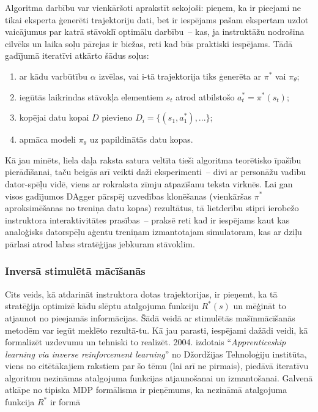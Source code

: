 \documentclass[12pt, a4paper]{article}
\numberwithin{equation}{section} %
\begin{document}
Algoritma darbību var vienkāršoti aprakstīt sekojoši: pieņem, ka ir pieejami ne tikai eksperta ģenerēti trajektoriju dati, bet ir iespējams pašam ekspertam uzdot vaicājumus par katrā stāvoklī optimālu darbību~-- kas, ja instruktāžu nodrošina cilvēks un laika soļu pārejas ir biežas, reti kad būs praktiski iespējams. Tādā gadījumā iteratīvi atkārto šādus soļus:

\begin{enumerate}
    \item ar kādu varbūtību $\alpha$ izvēlas, vai i-tā trajektorija tiks ģenerēta ar $\pi^*$ vai $\pi_{\theta}$;
    \item iegūtās laikrindas stāvokļa elementiem $s_t$ atrod atbilstošo $a^*_t=\pi^*(s_t)$;
    \item kopējai datu kopai $D$ pievieno $D_i=\lbrace (s_1, a^*_1),... \rbrace$;
    \item apmāca modeli $\pi_{\theta}$ uz papildinātās datu kopas.
\end{enumerate}

Kā jau minēts, liela daļa raksta satura veltīta tieši algoritma teorētisko īpašību pierādīšanai, taču beigās arī veikti daži eksperimenti~-- divi ar personāžu vadību dator-spēļu vidē, viens ar rokraksta zīmju atpazīšanu teksta virknēs. Lai gan visos gadījumos DAgger pārspēj uzvedības klonēšanas (vienkāršas $\pi^*$ aproksimēšanas no treniņa datu kopas) rezultātus, tā lietderību stipri ierobežo instruktora interaktivitātes prasības~-- praksē reti kad ir iespējams kaut kas analoģisks datorspēļu aģentu treniņam izmantotajam simulatoram, kas ar dziļu pārlasi atrod labas stratēģijas jebkuram stāvoklim.

\subsubsection{Inversā stimulētā mācīšanās}

Cits veids, kā atdarināt instruktora dotas trajektorijas, ir pieņemt, ka tā stratēģija optimizē kādu slēptu atalgojuma funkciju $R^*(s)$ un mēģināt to atjaunot no pieejamās informācijas. Šādā veidā ar stimulētās mašīnmācīšanās metodēm var iegūt meklēto rezultā-tu. Kā jau parasti, iespējami dažādi veidi, kā formalizēt uzdevumu un tehniski to realizēt. 2004. izdotais ``\textit{Apprenticeship learning via inverse reinforcement learning}'' \cite{abbeel2004apprenticeship} no Džordžijas Tehnoloģiju institūta, viens no citētākajiem rakstiem par šo tēmu (lai arī ne pirmais), piedāvā iteratīvu algoritmu nezināmas atalgojuma funkcijas atjaunošanai un izmantošanai. Galvenā atkāpe no tipiska MDP formālisma ir pieņēmums, ka nezināmā atalgojuma funkcija $R^*$ ir formā
\end{document}
